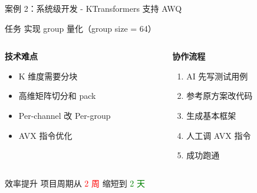 \documentclass[aspectratio=169,xcolor=dvipsnames]{beamer}
\begin{document}
\begin{frame}{案例 2：系统级开发 - KTransformers 支持 AWQ}
  \begin{block}{任务}
    实现 group 量化（group size = 64）
  \end{block}

  \begin{columns}
    \begin{column}{0.48\textwidth}
      \textbf{技术难点}
      \begin{itemize}
        \item K 维度需要分块
        \item 高维矩阵切分和 pack
        \item Per-channel 改 Per-group
        \item AVX 指令优化
      \end{itemize}
    \end{column}
    \begin{column}{0.48\textwidth}
      \textbf{协作流程}
      \begin{enumerate}
        \item AI 先写测试用例
        \item 参考原方案改代码
        \item 生成基本框架
        \item 人工调 AVX 指令
        \item 成功跑通
      \end{enumerate}
    \end{column}
  \end{columns}

  \vspace{0.3cm}

  \begin{alertblock}{效率提升}
    项目周期从 \textcolor{red}{2 周} 缩短到 \textcolor{green}{2 天}
  \end{alertblock}
\end{frame}
\end{document}
